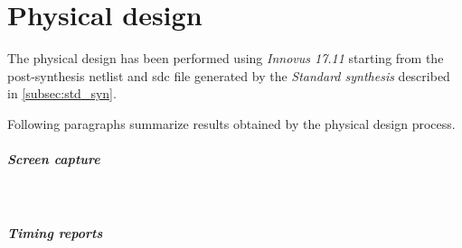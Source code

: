 \graphicspath{{./chapters/04-physical_design/figures/}}

\chapter{Physical design}
\label{chap:physical_design}
The physical design has been performed using \textit{Innovus 17.11} starting
from the post-synthesis netlist and sdc file generated by the \textit{Standard
synthesis} described in \ref{subsec:std_syn}.

\bigskip
Following paragraphs summarize results obtained by the physical design process.

\paragraph{Screen capture} \mbox{} \\
\begin{figure}[H]
	\centering
	\label{fig:scr_cap}
\end{figure}

\paragraph{Timing reports} \mbox{} \\
\lstset{
	basicstyle=\tiny,
	frame=single,
	breaklines=true
}



